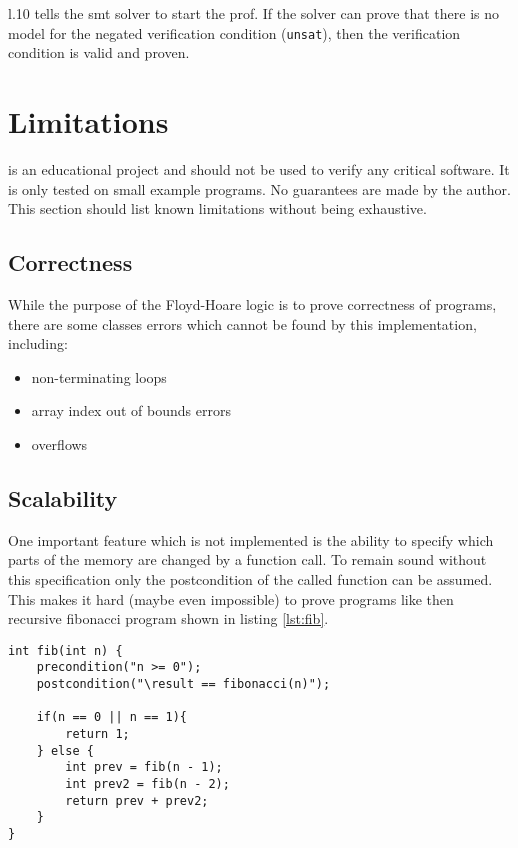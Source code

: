 \documentclass[12pt]{article}
\begin{document}
l.10 tells the smt solver to start the prof. 
If the solver can prove that there is no model for the negated verification condition (\texttt{unsat}), then the verification condition is valid and proven.

\section{Limitations}

\verifyc is an educational project and should not be used to verify any critical software.
It is only tested on small example programs.
No guarantees are made by the author.
This section should list known limitations without being exhaustive.

\subsection{Correctness}
\label{correctness}
While the purpose of the Floyd-Hoare logic is to prove correctness of programs,
there are some classes errors which cannot be found by this implementation, including:
\begin{itemize}
    \item non-terminating loops
    \item array index out of bounds errors
    \item overflows
\end{itemize}

\subsection{Scalability}
\label{completeness}
One important feature which is not implemented is the ability to specify which parts of the memory are
changed by a function call.
To remain sound without this specification only the postcondition of the called function can be assumed.
This makes it hard (maybe even impossible) to prove programs like then recursive fibonacci program shown in listing \ref{lst:fib}.

\begin{minipage}{\linewidth}
\begin{lstlisting}[style=c0, caption=a recursive fibonacci program, label=lst:fib]
int fib(int n) {
    precondition("n >= 0");
    postcondition("\result == fibonacci(n)");

    if(n == 0 || n == 1){
        return 1;
    } else {
        int prev = fib(n - 1);
        int prev2 = fib(n - 2);
        return prev + prev2;
    }
}
\end{lstlisting}
\end{minipage}
\end{document}
